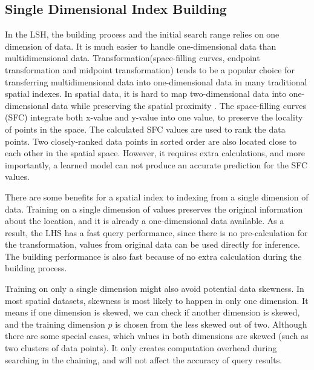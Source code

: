 
\subsection{Single Dimensional Index Building}

In the LSH, the building process and the initial search range relies on one dimension of data. It is much easier to handle one-dimensional data than multidimensional data. Transformation(space-filling curves, endpoint transformation and midpoint transformation) tends to be a popular choice for transferring multidimensional data into one-dimensional data in many traditional spatial indexes. In spatial data, it is hard to map two-dimensional data into one-dimensional data while preserving the spatial proximity \cite{Gaede:1998fp}. The space-filling curves (SFC) integrate both x-value and y-value into one value, to preserve the locality of points in the space. The calculated SFC values are used to rank the data points. Two closely-ranked data points in sorted order are also located close to each other in the spatial space. However, it requires extra calculations, and more importantly, a learned model can not produce an accurate prediction for the SFC values. 


There are some benefits for a spatial index to indexing from a single dimension of data. Training on a single dimension of values preserves the original information about the location, and it is already a one-dimensional data available. As a result, the LHS has a fast query performance, since there is no pre-calculation for the transformation, values from original data can be used directly for inference. The building performance is also fast because of no extra calculation during the building process. 

Training on only a single dimension might also avoid potential data skewness. In most spatial datasets, skewness is most likely to happen in only one dimension. It means if one dimension is skewed, we can check if another dimension is skewed, and the training dimension $p$ is chosen from the less skewed out of two. Although there are some special cases, which values in both dimensions are skewed (such as two clusters of data points). It only creates computation overhead during searching in the chaining, and will not affect the accuracy of query results. 


